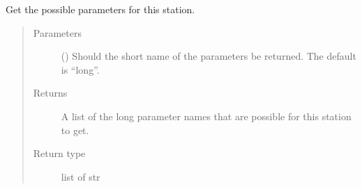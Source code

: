 \documentclass[letterpaper,10pt,english]{sphinxmanual}
\begin{document}
\begin{fulllineitems}
\begin{fulllineitems}
\label{\detokenize{weatherDB:weatherDB.station.GroupStation.get_possible_paras}}
\sphinxAtStartPar
Get the possible parameters for this station.
\begin{quote}\begin{description}
\item[{Parameters}] \leavevmode
\sphinxAtStartPar
{} (\sphinxstyleliteralemphasis{\sphinxupquote{, }}) \textendash{} Should the short name of the parameters be returned.
The default is “long”.

\item[{Returns}] \leavevmode
\sphinxAtStartPar
A list of the long parameter names that are possible for this station to get.

\item[{Return type}] \leavevmode
\sphinxAtStartPar
list of str

\end{description}\end{quote}

\end{fulllineitems}


\end{fulllineitems}

\end{document}

